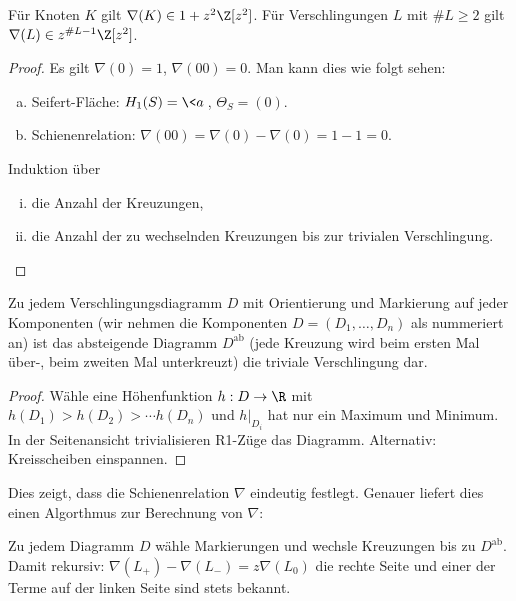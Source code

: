 \begin{kor}
    Für Knoten $K$ gilt $\nabla(K) \in 1 + z^2 \Z[z^2]$.
    Für Verschlingungen $L$ mit $\# L \ge 2$ gilt $\nabla(L) \in z^{\#L - 1} \Z[z^2]$.
    \begin{proof}
        Es gilt $\nabla(0) = 1$, $\nabla(00) = 0$.
        Man kann dies wie folgt sehen:
        \begin{enumerate}[a)]
            \item
                Seifert-Fläche:
                $H_1(S) = \<a\>$, $\Theta_S = (0)$.
            \item
                Schienenrelation:
                \begin{math}
                    \nabla(00) = \nabla(0) - \nabla(0) = 1 - 1 = 0.
                \end{math}
        \end{enumerate}
        Induktion über
        \begin{enumerate}[i)]
            \item
                die Anzahl der Kreuzungen,
            \item
                die Anzahl der zu wechselnden Kreuzungen bis zur trivialen Verschlingung.
        \end{enumerate}
    \end{proof}
\end{kor}

\begin{lem}
    Zu jedem Verschlingungsdiagramm $D$ mit Orientierung und Markierung auf jeder Komponenten (wir nehmen die Komponenten $D = (D_1, \dotsc, D_n)$ als nummeriert an) ist das absteigende Diagramm $D^{\text{ab}}$ (jede Kreuzung wird beim ersten Mal über-, beim zweiten Mal unterkreuzt) die triviale Verschlingung dar.

    \begin{proof}
        Wähle eine Höhenfunktion $h: D \to \R$ mit $h(D_1) > h(D_2) >\dotsb h(D_n)$ und $h|_{D_i}$ hat nur ein Maximum und Minimum.
        In der Seitenansicht trivialisieren R1-Züge das Diagramm.
        Alternativ: Kreisscheiben einspannen.
    \end{proof}
\end{lem}

\begin{prop}
    Dies zeigt, dass die Schienenrelation $\nabla$ eindeutig festlegt.
    Genauer liefert dies einen Algorthmus zur Berechnung von $\nabla$:

    Zu jedem Diagramm $D$ wähle Markierungen und wechsle Kreuzungen bis zu $D^{\text{ab}}$.
    Damit rekursiv:
    \begin{math}
        \nabla(L_+) - \nabla(L_-) = z \nabla(L_0)
    \end{math}
    die rechte Seite und einer der Terme auf der linken Seite sind stets bekannt.
\end{prop}

